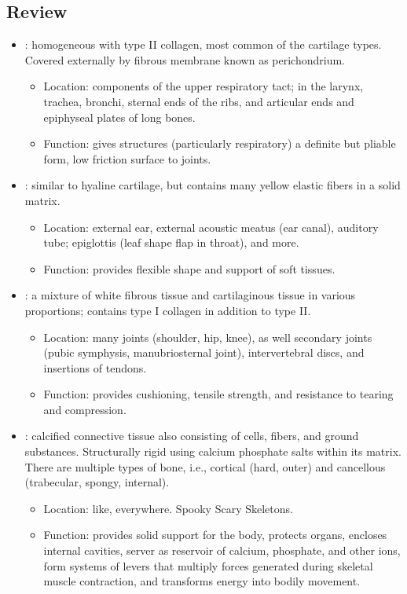 \begin{itemize}
  \subsection{Review}
  \begin{itemize}
    \item {}: homogeneous with type II collagen, most common of the cartilage types. Covered externally by fibrous membrane known as perichondrium. 
    \begin{itemize}
      \item Location: components of the upper respiratory tact; in the larynx, trachea, bronchi, sternal ends of the ribs, and articular ends and epiphyseal plates of long bones.
      \item Function: gives structures (particularly respiratory) a definite but pliable form, low friction surface to joints.
    \end{itemize}
    \item {}: similar to hyaline cartilage, but contains many yellow elastic fibers in a solid matrix. 
    \begin{itemize}
      \item Location: external ear, external acoustic meatus (ear canal), auditory tube; epiglottis (leaf shape flap in throat), and more.
      \item Function: provides flexible shape and support of soft tissues.
    \end{itemize}
    \item {}: a mixture of white fibrous tissue and cartilaginous tissue in various proportions; contains type I collagen in addition to type II\@.
    \begin{itemize}
      \item Location: many joints (shoulder, hip, knee), as well secondary joints (pubic symphysis, manubriosternal joint), intervertebral discs, and insertions of tendons.
      \item Function: provides cushioning, tensile strength, and resistance to tearing and compression.
    \end{itemize}
    \item {}: calcified connective tissue also consisting of cells, fibers, and ground substances. Structurally rigid using calcium phosphate salts within its matrix. There are multiple types of bone, i.e., cortical (hard, outer) and cancellous (trabecular, spongy, internal). 
    \begin{itemize}
      \item Location: like, everywhere. Spooky Scary Skeletons. 
      \item Function: provides solid support for the body, protects organs, encloses internal cavities, server as reservoir of calcium, phosphate, and other ions, form systems of levers that multiply forces generated during skeletal muscle contraction, and transforms energy into bodily movement.
    \end{itemize}
  \end{itemize}
  
\end{itemize}

